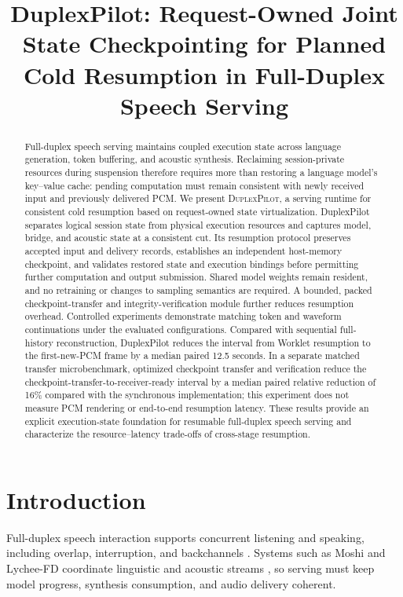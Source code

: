 \documentclass{article}
\title{DuplexPilot: Request-Owned Joint State Checkpointing for Planned Cold Resumption in Full-Duplex Speech Serving}
\begin{document}
\maketitle
\begin{abstract}
Full-duplex speech serving maintains coupled execution state across
language generation, token buffering, and acoustic synthesis.
Reclaiming session-private resources during suspension therefore
requires more than restoring a language model's key--value cache:
pending computation must remain consistent with newly received input
and previously delivered PCM.
We present \textsc{DuplexPilot}, a serving runtime for consistent
cold resumption based on request-owned state virtualization.
DuplexPilot separates logical session state from physical execution
resources and captures model, bridge, and acoustic state at a
consistent cut.
Its resumption protocol preserves accepted input and delivery records,
establishes an independent host-memory checkpoint, and validates
restored state and execution bindings before permitting further
computation and output submission.
Shared model weights remain resident, and no retraining or changes
to sampling semantics are required.
A bounded, packed checkpoint-transfer and integrity-verification module
further reduces resumption overhead.
Controlled experiments demonstrate matching token and waveform
continuations under the evaluated configurations.
Compared with sequential full-history reconstruction, DuplexPilot
reduces the interval from Worklet resumption to the first-new-PCM frame
by a median paired 12.5 seconds.
In a separate matched transfer microbenchmark, optimized checkpoint transfer and
verification reduce the checkpoint-transfer-to-receiver-ready interval
by a median paired relative reduction of 16\% compared with the
synchronous implementation; this experiment does not measure PCM
rendering or end-to-end resumption latency.
These results provide an explicit execution-state foundation for
resumable full-duplex speech serving and characterize the
resource--latency trade-offs of cross-stage resumption.
\end{abstract}

\section{Introduction}
\label{sec:introduction}

Full-duplex speech interaction supports concurrent listening and speaking,
including overlap, interruption, and backchannels \citep{dgslm2023,syncllm2024}.
Systems such as Moshi and Lychee-FD coordinate linguistic and acoustic
streams \citep{moshi2024,lychee2026}, so serving must keep model progress,
synthesis consumption, and audio delivery coherent.
\end{document}
